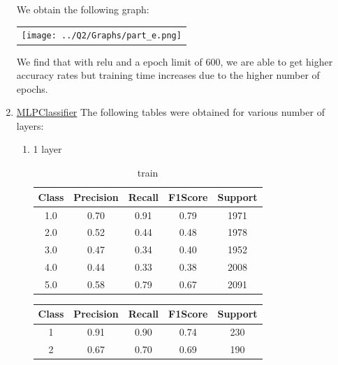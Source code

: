 \begin{enumerate}[label=(\alph*)]
\begin{enumerate}[label=\roman*.]
          \end{enumerate}
          We obtain the following graph:
          \begin{center}
              \begin{tabular}{c}
                  \texttt{[image: ../Q2/Graphs/part\_e.png]}
              \end{tabular}
          \end{center}
          We find that with relu and a epoch limit of 600, we are able to get higher accuracy rates but training time increases due to the higher number of epochs.
    \item \underline{MLPClassifier} The following tables were obtained for various number of layers:
          \begin{enumerate}[label=\roman*.]
              \item 1 layer
                    \begin{table}[!htb]
                        \centering
                        \begin{tabular}{ccccc}
                            \hline
                            Class & Precision & Recall & F1Score & Support \\ \hline
                            1.0   & 0.70      & 0.91   & 0.79    & 1971    \\
                            2.0   & 0.52      & 0.44   & 0.48    & 1978    \\
                            3.0   & 0.47      & 0.34   & 0.40    & 1952    \\
                            4.0   & 0.44      & 0.33   & 0.38    & 2008    \\
                            5.0   & 0.58      & 0.79   & 0.67    & 2091    \\ \hline
                        \end{tabular}
                        \caption{train}
                        \label{part f train depth 1}
                    \end{table}
                    \begin{table}[!htb]
                        \centering
                        \begin{tabular}{ccccc}
                            \hline
                            Class & Precision & Recall & F1Score & Support \\ \hline
                            1     & 0.91      & 0.90   & 0.74    & 230     \\
                            2     & 0.67      & 0.70   & 0.69    & 190     \\

\end{tabular}
\end{table}
\end{enumerate}
\end{enumerate}
